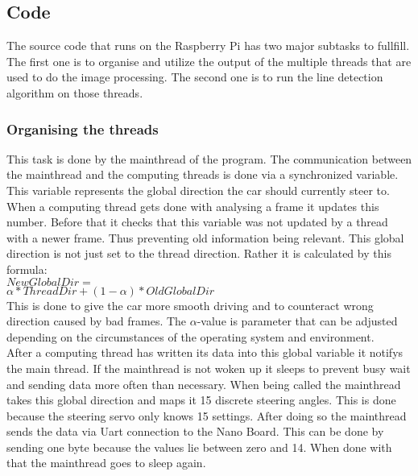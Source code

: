 \subsection{Code}
The source code that runs on the Raspberry Pi has two major subtasks to fullfill. The first one is to organise and utilize the output of the multiple threads that are used to do the image processing. The second one is to run the line detection algorithm on those threads. 
\subsubsection{Organising the threads}
This task is done by the mainthread of the program. The communication between the mainthread and the computing threads is done via a synchronized variable. This variable represents the global direction the car should currently steer to. When a computing thread gets done with analysing a frame it updates this number. Before that it checks that this variable was not updated by a thread with a newer frame. Thus preventing old information being relevant. This global direction is not just set to the thread direction. Rather it is calculated by this formula:\\
$NewGlobalDir =$\\$ \alpha * ThreadDir + (1-\alpha) * OldGlobalDir$\\
This is done to give the car more smooth driving and to counteract wrong direction caused by bad frames. The $\alpha$-value is parameter that can be adjusted depending on the circumstances of the operating system and environment.\\
After a computing thread has written its data into this global variable it notifys the main thread. If the mainthread is not woken up it sleeps to prevent busy wait and sending data more often than necessary. When being called the mainthread takes this global direction and maps it 15 discrete steering angles. This is done because the steering servo only knows 15 settings. After doing so the mainthread sends the data via Uart connection to the Nano Board. This can be done by sending one byte because the values lie between zero and 14. When done with that the mainthread goes to sleep again.

